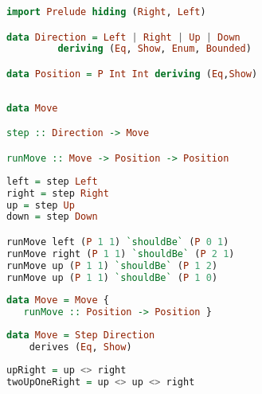 \documentclass[10pt]{beamer}
\begin{document}
\begin{frame}[fragile]
\begin{lstlisting}[language=haskell, basicstyle=\ttfamily]
import Prelude hiding (Right, Left)

data Direction = Left | Right | Up | Down
         deriving (Eq, Show, Enum, Bounded)

data Position = P Int Int deriving (Eq,Show)
\end{lstlisting}
\end{frame}
\begin{frame}[fragile]
\begin{lstlisting}[language=haskell, basicstyle=\ttfamily]
\end{lstlisting}
\end{frame}
\begin{frame}[fragile]
  \begin{lstlisting}[language=haskell, basicstyle=\ttfamily]
data Move

step :: Direction -> Move

runMove :: Move -> Position -> Position
\end{lstlisting}
\end{frame}
\begin{frame}[fragile]
\begin{lstlisting}[language=haskell, basicstyle=\ttfamily]
left = step Left
right = step Right
up = step Up
down = step Down

runMove left (P 1 1) `shouldBe` (P 0 1)
runMove right (P 1 1) `shouldBe` (P 2 1)
runMove up (P 1 1) `shouldBe` (P 1 2)
runMove up (P 1 1) `shouldBe` (P 1 0)
\end{lstlisting}
\end{frame}
\begin{frame}[fragile]
\begin{lstlisting}[language=haskell, basicstyle=\ttfamily]
data Move = Move {
   runMove :: Position -> Position }

\end{lstlisting}
\end{frame}
\begin{frame}[fragile]
\begin{lstlisting}[language=haskell, basicstyle=\ttfamily]
data Move = Step Direction
    derives (Eq, Show)
\end{lstlisting}
\end{frame}
\begin{frame}[fragile]
\begin{lstlisting}[language=haskell, basicstyle=\ttfamily]
upRight = up <> right 
twoUpOneRight = up <> up <> right 
\end{lstlisting}
\end{frame}
\end{document}
